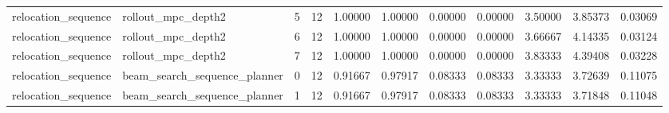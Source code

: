\documentclass{article}
\begin{document}
\begin{table}[tbp]
{\begin{tabular}{lllllllllll}
relocation\_sequence & rollout\_mpc\_depth2 & 5 & 12 & 1.00000 & 1.00000 & 0.00000 & 0.00000 & 3.50000 & 3.85373 & 0.03069 \\
relocation\_sequence & rollout\_mpc\_depth2 & 6 & 12 & 1.00000 & 1.00000 & 0.00000 & 0.00000 & 3.66667 & 4.14335 & 0.03124 \\
relocation\_sequence & rollout\_mpc\_depth2 & 7 & 12 & 1.00000 & 1.00000 & 0.00000 & 0.00000 & 3.83333 & 4.39408 & 0.03228 \\
relocation\_sequence & beam\_search\_sequence\_planner & 0 & 12 & 0.91667 & 0.97917 & 0.08333 & 0.08333 & 3.33333 & 3.72639 & 0.11075 \\
relocation\_sequence & beam\_search\_sequence\_planner & 1 & 12 & 0.91667 & 0.97917 & 0.08333 & 0.08333 & 3.33333 & 3.71848 & 0.11048 \\
\bottomrule
\end{tabular}
}
\end{table}

\clearpage
\end{document}
